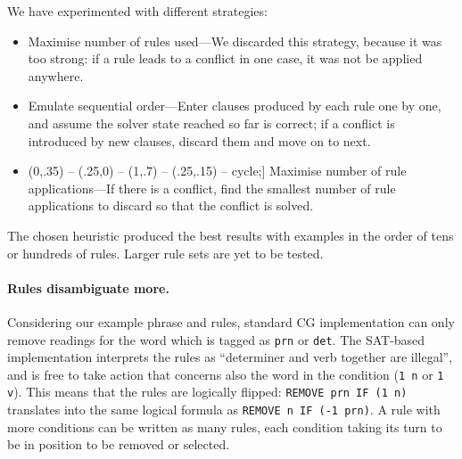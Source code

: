 \documentclass[11pt]{article}
\newcommand{\todo}[1]{{\color{cyan}\textbf{[TODO: }#1\textbf{]}}}
\def\checkmark{\tikz\fill[scale=0.4](0,.35) -- (.25,0) -- (1,.7) --
  (.25,.15) -- cycle;}
\begin{document}
We have experimented with different strategies:
\begin{itemize}
\item Maximise
number of rules used---We discarded this strategy, because it was too strong: if a rule leads to a conflict in one case, it was not be applied anywhere.
\item Emulate sequential order---Enter clauses produced by each rule one by one, and assume the solver state reached so far is correct; if a conflict is introduced by new clauses, discard them and move on to next.
\item [\checkmark] Maximise number of rule applications---If there is a conflict, find the smallest number of rule applications to discard so that the conflict is solved.
\end{itemize}
The chosen heuristic produced the best results with examples in the order of tens or hundreds of rules.
Larger rule sets are yet to be tested.


\paragraph{Rules disambiguate more.}
Considering our example phrase and rules, standard CG implementation
can only remove readings for the word which is tagged as \texttt{prn} or
\texttt{det}. The SAT-based implementation interprets the rules as
``determiner and verb together are illegal'', and is free to take action that concerns also the word in the condition (\texttt{1 n} or \texttt{1 v}).
This means that the rules are logically flipped: \texttt{REMOVE prn IF
  (1 n)} translates into the same logical formula as  \texttt{REMOVE n
  IF (-1 prn)}. A rule with more conditions can be written as many
rules, each condition taking its turn to be in position to be removed
or selected. \\

\end{document}
